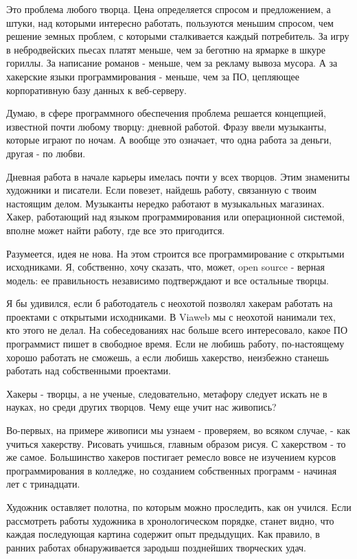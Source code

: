 \documentclass[ebook,12pt,oneside,openany]{memoir}
\begin{document}
Это проблема любого творца. Цена определяется спросом и предложением,
а штуки, над которыми интересно работать, пользуются меньшим спросом,
чем решение земных проблем, с которыми сталкивается каждый
потребитель. За игру в небродвейских пьесах платят меньше, чем за
беготню на ярмарке в шкуре гориллы. За написание романов - меньше, чем
за рекламу вывоза мусора. А за хакерские языки программирования -
меньше, чем за ПО, цепляющее корпоративную базу данных к веб-серверу.

Думаю, в сфере программного обеспечения проблема решается концепцией,
известной почти любому творцу: дневной работой. Фразу ввели музыканты,
которые играют по ночам. А вообще это означает, что одна работа за
деньги, другая - по любви.

Дневная работа в начале карьеры имелась почти у всех творцов. Этим
знамениты художники и писатели. Если повезет, найдешь работу,
связанную с твоим настоящим делом. Музыканты нередко работают в
музыкальных магазинах. Хакер, работающий над языком программирования
или операционной системой, вполне может найти работу, где все это
пригодится.

Разумеется, идея не нова. На этом строится все программирование с
открытыми исходниками. Я, собственно, хочу сказать, что, может, open
source - верная модель: ее правильность независимо подтверждают и все
остальные творцы.

Я бы удивился, если б работодатель с неохотой позволял хакерам
работать на проектами с открытыми исходниками. В Viaweb мы с неохотой
нанимали тех, кто этого не делал. На собеседованиях нас больше всего
интересовало, какое ПО программист пишет в свободное время. Если не
любишь работу, по-настоящему хорошо работать не сможешь, а если любишь
хакерство, неизбежно станешь работать над собственными проектами.

Хакеры - творцы, а не ученые, следовательно, метафору следует искать
не в науках, но среди других творцов. Чему еще учит нас живопись?

Во-первых, на примере живописи мы узнаем - проверяем, во всяком
случае, - как учиться хакерству. Рисовать учишься, главным образом
рисуя. С хакерством - то же самое. Большинство хакеров постигает
ремесло вовсе не изучением курсов программирования в колледже, но
созданием собственных программ - начиная лет с тринадцати.

Художник оставляет полотна, по которым можно проследить, как он
учился. Если рассмотреть работы художника в хронологическом порядке,
станет видно, что каждая последующая картина содержит опыт предыдущих.
Как правило, в ранних работах обнаруживается зародыш позднейших
творческих удач.
\end{document}
